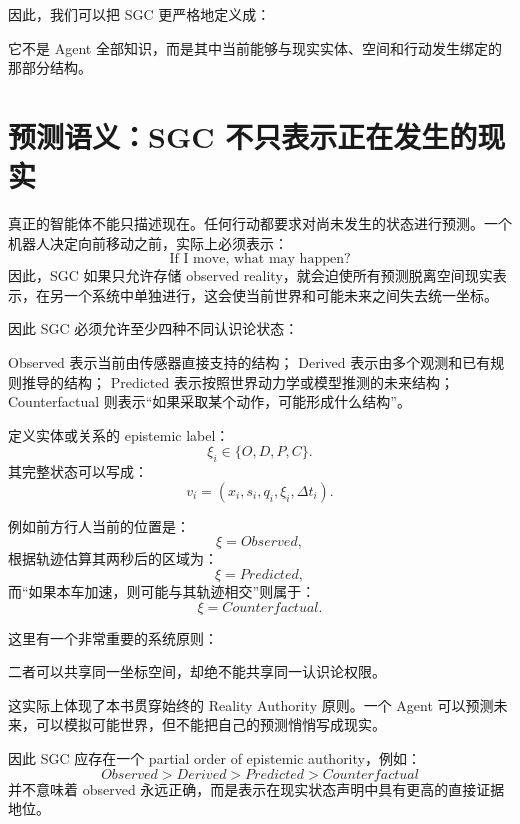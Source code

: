 因此，我们可以把 SGC 更严格地定义成：
\begin{statementbox}
\centering
{}
\end{statementbox}

它不是 Agent 全部知识，而是其中当前能够与现实实体、空间和行动发生绑定的那部分结构。

\section{预测语义：SGC 不只表示正在发生的现实}

真正的智能体不能只描述现在。任何行动都要求对尚未发生的状态进行预测。一个机器人决定向前移动之前，实际上必须表示：
\[
\text{If I move, what may happen?}
\]
因此，SGC 如果只允许存储 observed reality，就会迫使所有预测脱离空间现实表示，在另一个系统中单独进行，这会使当前世界和可能未来之间失去统一坐标。

因此 SGC 必须允许至少四种不同认识论状态：
\begin{statementbox}
\centering
{}
\end{statementbox}

Observed 表示当前由传感器直接支持的结构；
Derived 表示由多个观测和已有规则推导的结构；
Predicted 表示按照世界动力学或模型推测的未来结构；
Counterfactual 则表示“如果采取某个动作，可能形成什么结构”。

定义实体或关系的 epistemic label：
\[
\xi_i
\in
\{
O,D,P,C
\}.
\]
其完整状态可以写成：
\[
v_i
=
(x_i,s_i,q_i,\xi_i,\Delta t_i).
\]

例如前方行人当前的位置是：
\[
\xi=Observed,
\]
根据轨迹估算其两秒后的区域为：
\[
\xi=Predicted,
\]
而“如果本车加速，则可能与其轨迹相交”则属于：
\[
\xi=Counterfactual.
\]

这里有一个非常重要的系统原则：
\begin{statementbox}
\centering
{}
\end{statementbox}

二者可以共享同一坐标空间，却绝不能共享同一认识论权限。

这实际上体现了本书贯穿始终的 Reality Authority 原则。一个 Agent 可以预测未来，可以模拟可能世界，但不能把自己的预测悄悄写成现实。

因此 SGC 应存在一个 partial order of epistemic authority，例如：
\[
Observed
>
Derived
>
Predicted
>
Counterfactual
\]
并不意味着 observed 永远正确，而是表示在现实状态声明中具有更高的直接证据地位。

